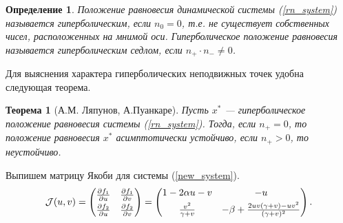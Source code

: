 \documentclass[10pt]{article}
\newtheorem{theorem}{Теорема}
\newtheorem{definition}{Определение}
\numberwithin{equation}{section}
\begin{document}
\begin{definition}
	Положение равновесия динамической системы (\ref{rn_system}) называется гиперболическим, если \( n_0 = 0 \), т.е. не существует собственных чисел, расположенных на мнимой оси. Гиперболическое положение равновесия называется гиперболическим седлом, если \( n_{+} \cdot n_{-} \ne 0 \).
\end{definition}
\noindent Для выяснения характера гиперболических неподвижных точек удобна следующая теорема.
\begin{theorem}[А.М. Ляпунов, А.Пуанкаре]
	Пусть \( x^* \) --- гиперболическое положение равновесия системы (\ref{rn_system}). Тогда, если \( n_{+} = 0 \), то положение равновесия \( x^* \) асимптотически устойчиво, если \( n_{+} > 0 \), то неустойчиво.
\end{theorem}

\noindent Выпишем матрицу Якоби для системы (\ref{new_system}).
\begin{equation}
	\mathcal{J}(u,v) = \begin{pmatrix} \frac{\partial f_1}{\partial u} & \frac{\partial f_1}{\partial v} \smallskip\\  \frac{\partial f_2}{\partial u} & \frac{\partial f_2}{\partial v}\end{pmatrix} = \begin{pmatrix} 1 - 2\alpha u - v & -u \smallskip\\ \frac{v^2}{\gamma + v} & -\beta + \frac{2uv(\gamma + v) - uv^2}{(\gamma + v)^2} \end{pmatrix}.
\end{equation}
\end{document}
